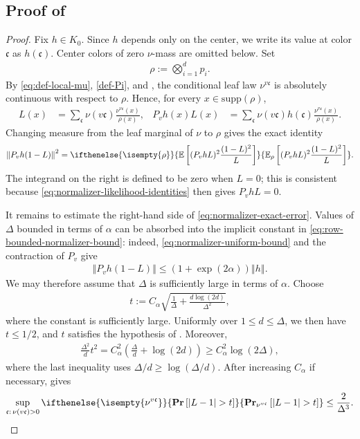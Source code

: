 \documentclass[a4paper,12pt]{article}
\theoremstyle{plain}
\theoremstyle{definition}
\def\-#1{\mathrm{#1}} %
\def\!#1{\mathfrak{#1}} %
\def\-#1{\mathrm{#1}} %
\def\!#1{\mathfrak{#1}} %
\def\oPr{\mathbf{Pr}}
\renewcommand{\Pr}[2][]{ \ifthenelse{\isempty{#1}}
  {\oPr\left[#2\right]}
  {\oPr_{#1}\left[#2\right]} } %
\def\oE{\mathbb{E}}
\newcommand{\E}[2][]{ \ifthenelse{\isempty{#1}}
  {\oE\left[#2\right]}
  {\oE_{#1}\left[#2\right]} }
\newcommand{\norm}[1]{\left\Vert#1\right\Vert}
\newcommand{\tuple}[1]{\left(#1\right)}
\newcommand{\tp}{\tuple}
\newcommand{\abs}[1]{\left\vert#1\right\vert}
\begin{document}
\subsection{Proof of }
\label{sec:row-bounded-normalizer}

\begin{proof}
Fix $h\in K_0$.  Since $h$ depends only on the center, we write its
value at color $\!c$ as $h(\!c)$.  Center colors of zero $\nu$-mass are
omitted below.  Set
\begin{align*}
  \rho:=\bigotimes_{i=1}^d p_i.
\end{align*}
By \eqref{eq:def-local-mu}, \eqref{def-Pi}, and , the
conditional leaf law $\nu^{v\!c}$ is absolutely continuous with
respect to $\rho$.  Hence, for every $x\in\-{supp}(\rho)$,
\begin{align}
  L(x)
  &=
  \sum_{\!c}\nu(v\!c)\frac{\nu^{v\!c}(x)}{\rho(x)},
  &
  P_vh(x)L(x)
  &=
  \sum_{\!c}\nu(v\!c)h(\!c)
  \frac{\nu^{v\!c}(x)}{\rho(x)}.
  \label{eq:normalizer-likelihood-identities}
\end{align}
Changing measure from the leaf marginal of $\nu$ to $\rho$ gives the
exact identity
\begin{align}
  \norm{P_vh(1-L)}^2
  =
  \E[\rho]{
    (P_vhL)^2\frac{(1-L)^2}{L}
  }.
  \label{eq:normalizer-exact-error}
\end{align}
The integrand on the right is defined to be zero when $L=0$; this is
consistent because \eqref{eq:normalizer-likelihood-identities} then
gives $P_vhL=0$.

It remains to estimate the right-hand side of
\eqref{eq:normalizer-exact-error}.  Values of $\Delta$ bounded in terms
of $\alpha$ can be absorbed into the implicit constant in
\eqref{eq:row-bounded-normalizer-bound}: indeed,
\eqref{eq:normalizer-uniform-bound} and the contraction of $P_v$ give
\begin{align*}
  \norm{P_vh(1-L)}
  \leq
  \tp{1+\exp(2\alpha)}\norm{h}.
\end{align*}
We may therefore assume that $\Delta$ is sufficiently large in terms
of $\alpha$.  Choose
\begin{align*}
  t
  :=
  C_\alpha
  \sqrt{
    \frac1\Delta
    +\frac{d\log(2d)}{\Delta^2}
  },
\end{align*}
where the constant is sufficiently large.  Uniformly over
$1\leq d\leq\Delta$, we then have $t\leq1/2$, and $t$ satisfies the
hypothesis of .  Moreover,
\begin{align*}
  \frac{\Delta^2}{d}t^2
  =
  C_\alpha^2
  \tp{
    \frac{\Delta}{d}+\log(2d)
  }
  \geq
  C_\alpha^2\log(2\Delta),
\end{align*}
where the last inequality uses
$\Delta/d\geq\log(\Delta/d)$.  After increasing $C_\alpha$ if
necessary,  gives
\begin{align}
  \sup_{\!c:\,\nu(v\!c)>0}
  \Pr[\nu^{v\!c}]{\abs{L-1}>t}
  \leq
  \frac{2}{\Delta^3}.
  \label{eq:normalizer-tail-at-t}
\end{align}


\end{proof}
\end{document}
